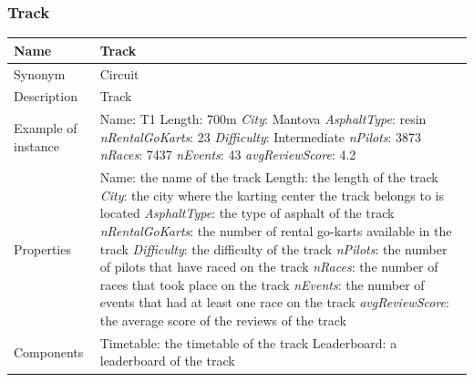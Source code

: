 \documentclass{beamer}
\begin{document}
\begin{frame}
\frametitle{Track}
\begin{table}
\tiny
\begin{tabular}{|p{2cm}|p{6cm}|}
\hline
Name & \textbf{Track} \\
\hline
Synonym & Circuit \\
\hline
Description & Track \\
\hline
Example of instance &
Name: T1 \newline
Length: 700m \newline
\textit{City}: Mantova \newline
\textit{AsphaltType}: resin \newline
\textit{nRentalGoKarts}: 23 \newline
\textit{Difficulty}: Intermediate \newline
\textit{nPilots}: 3873 \newline
\textit{nRaces}: 7437 \newline
\textit{nEvents}: 43 \newline
\textit{avgReviewScore}: 4.2 \\
\hline
Properties &
Name: the name of the track \newline
Length: the length of the track \newline
\textit{City}: the city where the karting center the track belongs to is located \newline
\textit{AsphaltType}: the type of asphalt of the track \newline
\textit{nRentalGoKarts}: the number of rental go-karts available in the track \newline
\textit{Difficulty}: the difficulty of the track \newline
\textit{nPilots}: the number of pilots that have raced on the track \newline
\textit{nRaces}: the number of races that took place on the track \newline
\textit{nEvents}: the number of events that had at least one race on the track \newline
\textit{avgReviewScore}: the average score of the reviews of the track \\
\hline
Components & 
Timetable: the timetable of the track \newline
Leaderboard: a leaderboard of the track \\
\hline
\end{tabular}
\end{table}
\end{frame}
\end{document}
